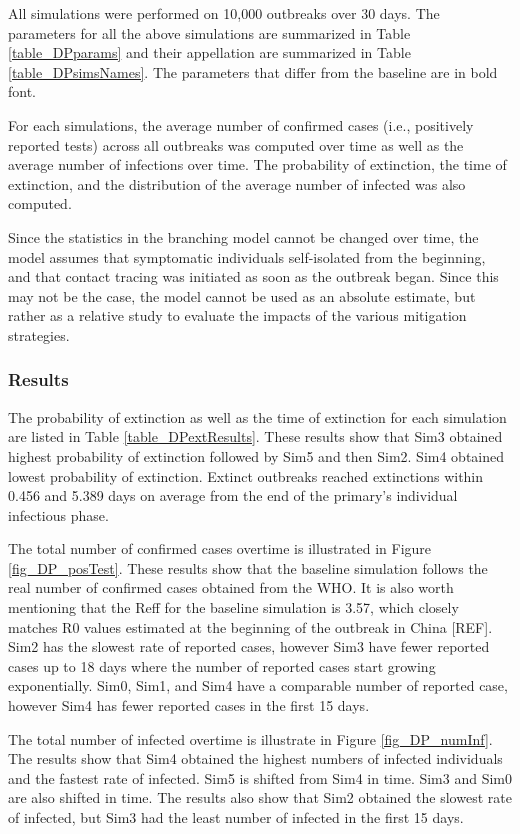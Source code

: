 \documentclass[sr]{drdc-report}
\begin{document}
All simulations were performed on 10,000 outbreaks over 30 days. The parameters for all the above simulations are summarized in Table \ref{table_DPparams} and their appellation are summarized in Table \ref{table_DPsimsNames}. The parameters that differ from the baseline are in bold font.  

For each simulations, the average number of confirmed cases (i.e., positively reported tests) across all outbreaks was computed over time as well as the average number of infections over time. The probability of extinction, the time of extinction, and the distribution of the average number of infected was also computed. 

Since the statistics in the branching model cannot be changed over time, the model assumes that symptomatic individuals self-isolated from the beginning, and that contact tracing was initiated as soon as the outbreak began. Since this may not be the case, the model cannot be used as an absolute estimate, but rather as a relative study to evaluate the impacts of the various mitigation strategies. 

\subsubsection{Results}
The probability of extinction as well as the time of extinction for each simulation are listed in Table \ref{table_DPextResults}. These results show that Sim3 obtained highest probability of extinction followed by Sim5 and then Sim2. Sim4 obtained lowest probability of extinction. Extinct outbreaks reached extinctions within 0.456 and 5.389 days on average from the end of the primary's individual infectious phase. 

The total number of confirmed cases overtime is illustrated in Figure \ref{fig_DP_posTest}. These results show that the baseline simulation follows the real number of confirmed cases obtained from the WHO. It is also worth mentioning that the Reff for the baseline simulation is 3.57, which closely matches R0 values estimated at the beginning of the outbreak in China [REF]. Sim2 has the slowest rate of reported cases, however Sim3 have fewer reported cases up to 18 days where the number of reported cases start growing exponentially. Sim0, Sim1, and Sim4 have a comparable number of reported case, however Sim4 has fewer reported cases in the first 15 days. 

The total number of infected overtime is illustrate in Figure \ref{fig_DP_numInf}. The results show that Sim4 obtained the highest numbers of infected individuals and the fastest rate of infected. Sim5 is shifted from Sim4 in time. Sim3 and Sim0 are also shifted in time. The results also show that Sim2 obtained the slowest rate of infected, but Sim3 had the least number of infected in the first 15 days. 
\end{document}
